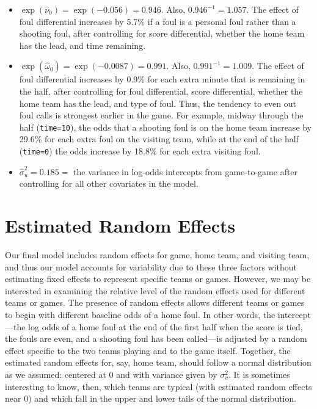 \documentclass[
]{krantz}
\begin{document}
\begin{itemize}
\item
  \(\exp(\hat{\nu}_{0})=\exp(-0.056)=0.946\). Also, \(0.946^{-1}=1.057\). The effect of foul differential increases by 5.7\% if a foul is a personal foul rather than a shooting foul, after controlling for score differential, whether the home team has the lead, and time remaining.
\item
  \(\exp(\hat{\omega}_{0})=\exp(-0.0087)=0.991\). Also, \(0.991^{-1}=1.009\). The effect of foul differential increases by 0.9\% for each extra minute that is remaining in the half, after controlling for foul differential, score differential, whether the home team has the lead, and type of foul. Thus, the tendency to even out foul calls is strongest earlier in the game. For example, midway through the half (\texttt{time=10}), the odds that a shooting foul is on the home team increase by 29.6\% for each extra foul on the visiting team, while at the end of the half (\texttt{time=0}) the odds increase by 18.8\% for each extra visiting foul.
\item
  \(\hat{\sigma}_{u}^{2}=0.185=\) the variance in log-odds intercepts from game-to-game after controlling for all other covariates in the model.
\end{itemize}

\hypertarget{estimatedRE}{%
\section{Estimated Random Effects}\label{estimatedRE}}

Our final model includes random effects for game, home team, and visiting team, and thus our model accounts for variability due to these three factors without estimating fixed effects to represent specific teams or games. However, we may be interested in examining the relative level of the random effects used for different teams or games. The presence of random effects allows different teams or games to begin with different baseline odds of a home foul. In other words, the intercept---the log odds of a home foul at the end of the first half when the score is tied, the fouls are even, and a shooting foul has been called---is adjusted by a random effect specific to the two teams playing and to the game itself. Together, the estimated random effects for, say, home team, should follow a normal distribution as we assumed: centered at 0 and with variance given by \(\sigma_{v}^{2}\). It is sometimes interesting to know, then, which teams are typical (with estimated random effects near 0) and which fall in the upper and lower tails of the normal distribution.
\end{document}
